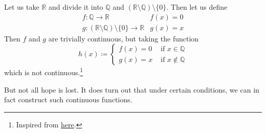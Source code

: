   \begin{example}
    Let us take $\mathbb{R}$ and divide it into $\mathbb{Q}$ and $(\mathbb{R} \setminus \mathbb{Q}) \setminus \{0\}$. Then let us define 
    \begin{align}
      f: \mathbb{Q} \rightarrow \mathbb{R} & f(x) = 0 \\ 
      g: (\mathbb{R} \setminus \mathbb{Q}) \setminus \{0\} \rightarrow \mathbb{R} & g(x) = x
    \end{align}
    Then $f$ and $g$ are trivially continuous, but taking the function 
    \begin{equation}
      h(x) \coloneqq \begin{cases} 
        f(x) = 0 & \text{ if } x \in \mathbb{Q} \\ 
        g(x) = x & \text{ if } x \not\in \mathbb{Q}
      \end{cases}
    \end{equation}
    which is not continuous.\footnote{Inspired from \href{https://math.stackexchange.com/questions/4034361/any-counter-example-of-pasting-lemma}{here}. }
  \end{example} 

  But not all hope is lost. It does turn out that under certain conditions, we can in fact construct such continuous functions. 

